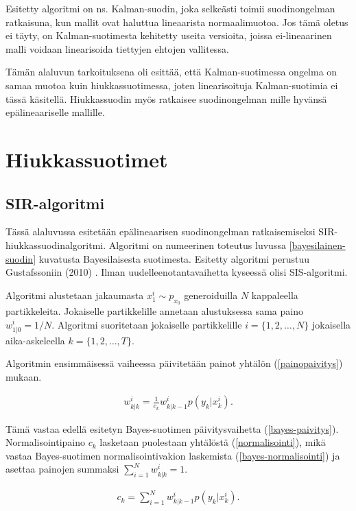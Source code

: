 \documentclass[
  12pt,
  a4paper, twoside]{book}
\begin{document}
Esitetty algoritmi on ns. Kalman-suodin, joka selkeästi toimii suodinongelman ratkaisuna, kun mallit ovat haluttua lineaarista normaalimuotoa. Jos tämä oletus ei täyty, on Kalman-suotimesta kehitetty useita versioita, joissa ei-lineaarinen malli voidaan linearisoida tiettyjen ehtojen vallitessa.

Tämän alaluvun tarkoituksena oli esittää, että Kalman-suotimessa ongelma on samaa muotoa kuin hiukkassuotimessa, joten linearisoituja Kalman-suotimia ei tässä käsitellä. Hiukkassuodin myös ratkaisee suodinongelman mille hyvänsä epälineaariselle mallille.

\chapter{Hiukkassuotimet} \label{hiukkassuotimet}

\section{SIR-algoritmi}

Tässä alaluvussa esitetään epälineaarisen suodinongelman ratkaisemiseksi SIR-hiukkassuodinalgoritmi. Algoritmi on numeerinen toteutus luvussa \ref{bayesilainen-suodin} kuvatusta Bayesilaisesta suotimesta. Esitetty algoritmi perustuu Gustafssoniin (2010) \citep{gustafsson-2010}. Ilman uudelleenotantavaihetta kyseessä olisi SIS-algoritmi.

Algoritmi alustetaan jakaumasta \(x_1^i\sim p_{x_0}\) generoiduilla \(N\) kappaleella partikkeleita. Jokaiselle partikkelille annetaan alustuksessa sama paino \(w_{1|0}^i=1/N\). Algoritmi suoritetaan jokaiselle partikkelille \(i=\{1,2,\ldots,N\}\) jokaisella aika-askeleella \(k=\{1,2,\ldots,T\}\).

Algoritmin ensimmäisessä vaiheessa päivitetään painot yhtälön (\ref{painopaivitys}) mukaan.

\begin{align}\label{painopaivitys}
w^i_{k|k}=\frac{1}{c_k}w^i_{k|k-1}p(y_k|x^i_k).
\end{align}

\noindent Tämä vastaa edellä esitetyn Bayes-suotimen päivitysvaihetta (\ref{bayes-paivitys}). Normalisointipaino \(c_k\) lasketaan puolestaan yhtälöstä (\ref{normalisointi}), mikä vastaa Bayes-suotimen normalisointivakion laskemista (\ref{bayes-normalisointi}) ja asettaa painojen summaksi \(\sum_{i=1}^Nw^i_{k|k}=1\).

\begin{align}\label{normalisointi}
c_k=\sum_{i=1}^{N}w_{k|{k-1}}^ip(y_k|x_k^i).
\end{align}
\end{document}
